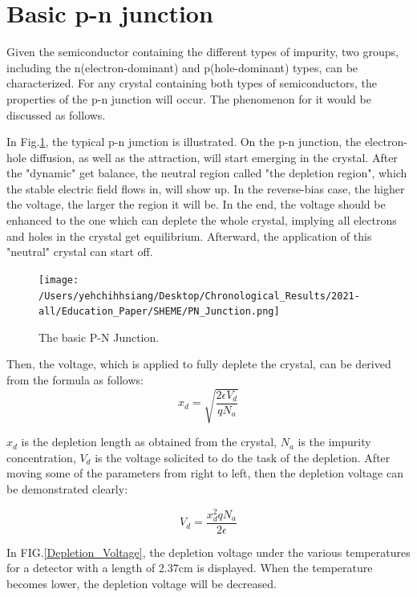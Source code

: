 \documentclass[%
 reprint,
 amsmath,amssymb,
 aps,
]{revtex4-2}
\begin{document}
\section{\label{sec:level2}Basic p-n junction}
Given the semiconductor containing the different types of impurity, two groups, including the n(electron-dominant) and p(hole-dominant) types, can be characterized. For any crystal containing both types of semiconductors, the properties of the p-n junction will occur. The phenomenon for it would be discussed as follows.\par
In Fig.\ref{PNPlot}, the typical p-n junction is illustrated. On the p-n junction, the electron-hole diffusion, as well as the attraction, will start emerging in the crystal. After the "dynamic" get balance, the neutral region called "the depletion region", which the stable electric field flows in, will show up. In the reverse-bias case, the higher the voltage, the larger the region it will be. In the end, the voltage should be enhanced to the one which can deplete the whole crystal, implying all electrons and holes in the crystal get equilibrium. Afterward, the application of this "neutral" crystal can start off.\par
\begin{figure}[h]
  \centering
  \texttt{[image: /Users/yehchihhsiang/Desktop/Chronological\_Results/2021-all/Education\_Paper/SHEME/PN\_Junction.png]}
  \caption{The basic P-N Junction.}
  \label{PNPlot}
\end{figure}
Then, the voltage, which is applied to fully deplete the crystal, can be derived from the formula as follows:
\begin{equation}
\label{MFP}
x_{d} = \sqrt{ \frac{2\epsilon V_{d}}{q N_{a}}}
\end{equation}

$x_{d}$ is the depletion length as obtained from the crystal, $N_{a}$ is the impurity concentration, $V_{d}$ is the voltage solicited to do the task of the depletion.  After moving some of the parameters from right to left, then the depletion voltage can be demonstrated clearly:

\begin{equation}
\label{MFP}
V_{d} = \frac{x_{d}^{2}qN_{a}}{2\epsilon}
\end{equation}

In FIG.\ref{Depletion_Voltage}, the depletion voltage under the various temperatures for a detector with a length of 2.37cm is displayed. When the temperature becomes lower, the depletion voltage will be decreased.\par
\end{document}
